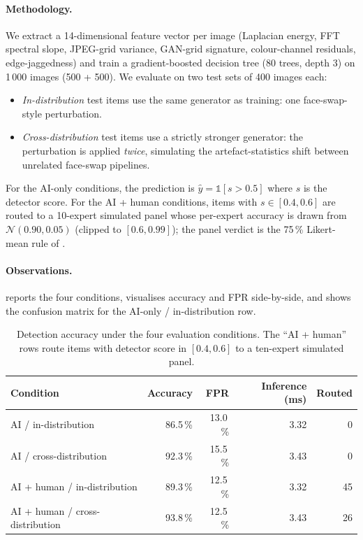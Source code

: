 \documentclass[11pt,a4paper]{article}
\theoremstyle{definition}
\theoremstyle{plain}
\theoremstyle{remark}
\begin{document}
\paragraph{Methodology.}
We extract a 14-dimensional feature vector per image (Laplacian
energy, FFT spectral slope, JPEG-grid variance, GAN-grid signature,
colour-channel residuals, edge-jaggedness) and train a
gradient-boosted decision tree (80 trees, depth 3) on 1\,000
images (500 + 500). We evaluate on two test sets of 400 images each:
\begin{itemize}[nosep]
\item \emph{In-distribution} test items use the same generator as
training: one face-swap-style perturbation.
\item \emph{Cross-distribution} test items use a strictly stronger
generator: the perturbation is applied \emph{twice}, simulating the
artefact-statistics shift between unrelated face-swap pipelines.
\end{itemize}
For the AI-only conditions, the prediction is
$\hat{y} = \mathbb{1}[s\!>\!0.5]$ where $s$ is the detector score.
For the AI + human conditions, items with $s \in [0.4, 0.6]$ are
routed to a 10-expert simulated panel whose per-expert accuracy is
drawn from $\mathcal{N}(0.90, 0.05)$ (clipped to $[0.6, 0.99]$); the
panel verdict is the 75\,\% Likert-mean rule of \cite{bib4}.

\paragraph{Observations.}
 reports the four conditions, 
visualises accuracy and FPR side-by-side, and  shows the
confusion matrix for the AI-only / in-distribution row.

\begin{table}[!ht]\centering
\caption{Detection accuracy under the four evaluation conditions. The
``AI + human'' rows route items with detector score in $[0.4,0.6]$ to
a ten-expert simulated panel.}\label{tab:exp5}
\small
\begin{tabular}{l r r r r}
\toprule
Condition & Accuracy & FPR & Inference (ms) & Routed \\
\midrule
AI / in-distribution             & 86.5\,\% & 13.0\,\% & 3.32 &  0 \\
AI / cross-distribution          & 92.3\,\% & 15.5\,\% & 3.43 &  0 \\
AI + human / in-distribution     & 89.3\,\% & 12.5\,\% & 3.32 & 45 \\
AI + human / cross-distribution  & 93.8\,\% & 12.5\,\% & 3.43 & 26 \\
\bottomrule
\end{tabular}
\end{table}
\end{document}
